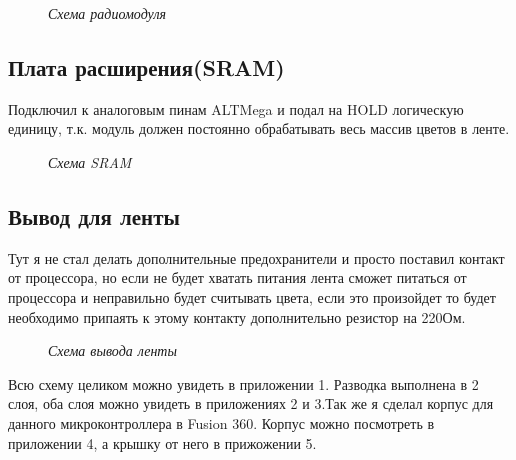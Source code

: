 \documentclass[a4paper, 12pt]{article}
\newcommand{\image}[3]{\begin{figure}[h!]\center{\texttt{[image: \#1]} }\caption{\textit{#3}}\end{figure}}
\begin{document}
\image{Схема_радиомодуля.png}{100}{Схема радиомодуля}

\subsection{Плата расширения(SRAM)}
Подключил к аналоговым пинам ALTMega и подал на HOLD логическую единицу, т.к. 
модуль должен постоянно обрабатывать весь массив цветов в ленте.

\image{Схема_SRAM.png}{100}{Схема SRAM}

\subsection{Вывод для ленты}
Тут я не стал делать дополнительные предохранители и просто поставил контакт 
от процессора, но если не будет хватать питания лента сможет питаться от 
процессора и неправильно будет считывать цвета, если это произойдет то будет 
необходимо припаять к этому контакту дополнительно резистор на 220Ом.

\image{Схема_вывода_ленты.png}{100}{Схема вывода ленты}

Всю схему целиком можно увидеть в приложении 1. Разводка выполнена в 2 слоя, 
оба слоя можно увидеть в приложениях 2 и 3.Так же я сделал корпус для данного 
микроконтроллера в Fusion 360. Корпус можно посмотреть в приложении 4, а крышку 
от него в прижожении 5.

\newpage
\end{document}
